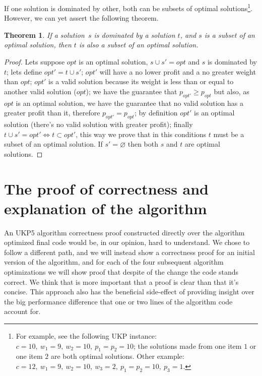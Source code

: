 \documentclass[12pt]{article}
\newtheorem{theorem}{Theorem}
\begin{document}
If one solution is dominated by other, both can be subsets of optimal solutions\footnote{For example, see the following UKP instance: \(c = 10,~w_1 = 9,~w_2 = 10,~p_1 = p_2 = 10\); the solutions made from one item \(1\) or one item \(2\) are both optimal solutions. Other example: \(c = 12,~w_1 = 9,~w_2 = 10,~w_3 = 2,~p_1 = p_2 = 10,~p_3 = 1\).}. However, we can yet assert the following theorem.
\vspace{0.3cm}
\begin{theorem}\label{theo:dominance} 
If a solution~\(s\) is dominated by a solution \(t\), and \(s\) is a subset of an optimal solution, then \(t\) is also a subset of an optimal solution.
\end{theorem}
\begin{proof}
Lets suppose \(opt\) is an optimal solution, \(s \cup s' = opt\) and \(s\) is dominated by \(t\); lets define \(opt' = t \cup s'\); \(opt'\) will have a no lower profit and a no greater weight than \(opt\); \(opt'\) is a valid solution because its weight is less than or equal to another valid solution (\(opt\)); we have the guarantee that \(p_{opt'} \geq p_{opt}\) but also, as \(opt\) is an optimal solution, we have the guarantee that no valid solution has a greater profit than it, therefore \(p_{opt'} = p_{opt}\); by definition \(opt'\) is an optimal solution (there's no valid solution with greater profit); finally \(t \cup s' = opt' \iff t \subset opt'\), this way we prove that in this conditions \(t\) must be a subset of an optimal solution. If \(s' = \varnothing\) then both \(s\) and \(t\) are optimal solutions.
\end{proof}

\section{The proof of correctness and explanation of the algorithm}

An UKP5 algorithm correctness proof constructed directly over the algorithm optimized final code would be, in our opinion, hard to understand. We chose to follow a different path, and we will instead show a correctness proof for an initial version of the algorithm, and for each of the four subsequent algorithm optimizations we will show proof that despite of the change the code stands correct. We think that is more important that a proof is clear than that it's concise. This approach also has the beneficial side-effect of providing insight over the big performance difference that one or two lines of the algorithm code account for.
\end{document}

